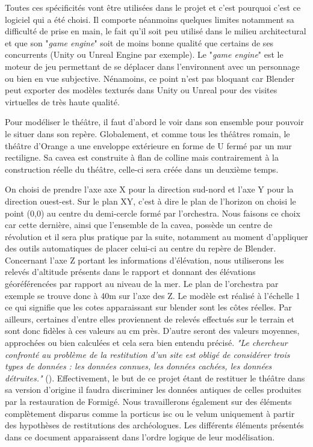Toutes ces spécificités vont être utilisées dans le projet et c'est pourquoi c'est ce logiciel qui a été choisi. Il comporte néanmoins quelques limites notamment sa difficulté de prise en main, le fait qu'il soit peu utilisé dans le milieu architectural et que son "\textit{game engine}" soit de moins bonne qualité que certains de ses concurrents (Unity ou Unreal Engine par exemple). Le "\textit{game engine}" est le moteur de jeu permettant de se déplacer dans l'environnent avec un personnage ou bien en vue subjective. Nénamoins, ce point n'est pas bloquant car Blender peut exporter des modèles texturés dans Unity ou Unreal pour des visites virtuelles de très haute qualité.

Pour modéliser le théâtre, il faut d'abord le voir dans son ensemble pour pouvoir le situer dans son repère. Globalement, et comme tous les théâtres romain, le théâtre d'Orange a une enveloppe extérieure en forme de U fermé par un mur rectiligne. Sa cavea est construite à flan de colline mais contrairement à la construction réelle du théâtre, celle-ci sera créée dans un deuxième temps. 

On choisi de prendre l'axe axe X pour la direction sud-nord et l'axe Y pour la direction ouest-est. Sur le plan XY, c'est à dire le plan de l'horizon on choisi le point (0,0) au centre du demi-cercle formé par l'\gls{orchestra}. Nous faisons ce choix car cette dernière, ainsi que l'ensemble de la \gls{cavea}, possède un centre de révolution et il sera plus pratique par la suite, notamment au moment d'appliquer des outils automatiques de placer celui-ci au centre du repère de Blender. Concernant l'axe Z portant les informations d'élévation, nous utiliserons les relevés d'altitude présents dans le rapport \cite{orangePl} et donnant des élévations géoréférencées par rapport au niveau de la mer. Le plan de l'\gls{orchestra} par exemple se trouve donc à 40m sur l'axe des Z. Le modèle est réalisé à l'échelle 1 ce qui signifie que les cotes apparaissant sur blender sont les côtes réelles. Par ailleurs, certaines d'entre elles proviennent de relevés effectués sur le terrain et sont donc fidèles à ces valeurs au cm près. D'autre seront des valeurs moyennes, approchées ou bien calculées et cela sera bien entendu précisé. \textit{"Le chercheur confronté au problème de la restitution d’un site est obligé de considérer trois types de données : les données connues, les données cachées, les données détruites."} (\cite{golvin}). Effectivement, le but de ce projet étant de restituer le théâtre dans sa version d'origine il faudra discriminer les données antiques de celles produites par la restauration de Formigé. 
Nous travaillerons également sur des éléments complètement disparus comme la \gls{porticus isc} ou le velum uniquement à partir des hypothèses de restitutions des archéologues. Les différents éléments présentés dans ce document apparaissent dans l'ordre logique de leur modélisation.

